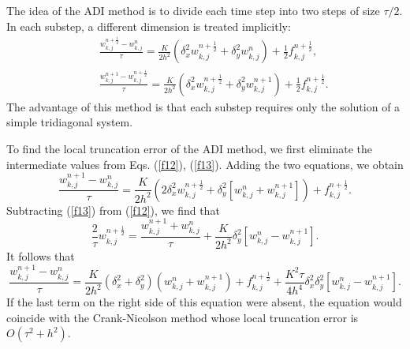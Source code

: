 \vskip 0.3cm
 
The idea of the ADI method is to divide each time step into two
steps of size $\tau/2$. In each substep, a different dimension is treated
implicitly:
\begin{eqnarray}
&&\frac{w^{n+\frac{1}{2}}_{k,j}-w^{n}_{k,j}}{\tau}=\frac{K}{2h^2}
\left(\delta^2_{x}w^{n+\frac{1}{2}}_{k,j}
+\delta^2_{y}w^{n}_{k,j}\right)+\frac{1}{2}f^{n+\frac{1}{2}}_{k,j}, \label{f12} \\
&&\frac{w^{n+1}_{k,j}-w^{n+\frac{1}{2}}_{k,j}}{\tau}=\frac{K}{2h^2}
\left(\delta^2_{x}w^{n+\frac{1}{2}}_{k,j}
+\delta^2_{y}w^{n+1}_{k,j}\right)+\frac{1}{2}f^{n+\frac{1}{2}}_{k,j}. \label{f13}
\end{eqnarray}
The advantage of this method is that each substep requires only
the solution of a simple tridiagonal system.


\vskip 0.3cm
 
To find the local truncation error of the ADI method, we first eliminate
the intermediate values from Eqs. (\ref{f12}), (\ref{f13}). Adding the two equations, we
obtain
\[
\frac{w^{n+1}_{k,j}-w^{n}_{k,j}}{\tau}=\frac{K}{2h^2}
\left(2\delta^2_{x}w^{n+\frac{1}{2}}_{k,j}
+\delta^2_{y}\left[w^{n}_{k,j}+w^{n+1}_{k,j}\right]\right)+f^{n+\frac{1}{2}}_{k,j}.
\]
Subtracting (\ref{f13}) from (\ref{f12}), we find that
\[
\frac{2}{\tau}w^{n+\frac{1}{2}}_{k,j}=\frac{w^{n+1}_{k,j}+w^{n}_{k,j}}{\tau}+
\frac{K}{2h^2}\delta^2_{y}\left[w^{n}_{k,j}-w^{n+1}_{k,j}\right].
\]
It follows that
\begin{equation}
\frac{w^{n+1}_{k,j}-w^{n}_{k,j}}{\tau}=\frac{K}{2h^2}
\left(\delta^2_{x}+\delta^2_{y}\right)\left(
w^{n}_{k,j}+w^{n+1}_{k,j}\right)+f^{n+\frac{1}{2}}_{k,j}+
\frac{K^2\tau}{4h^4}\delta^2_{x}\delta^2_{y}
\left[w^{n}_{k,j}-w^{n+1}_{k,j}\right]. \label{f14}
\end{equation}
If the last term on the right side of this equation were absent, the equation
would coincide with the Crank-Nicolson method whose local truncation
error is $O(\tau^2+h^2)$.

\vskip 0.3cm
 
